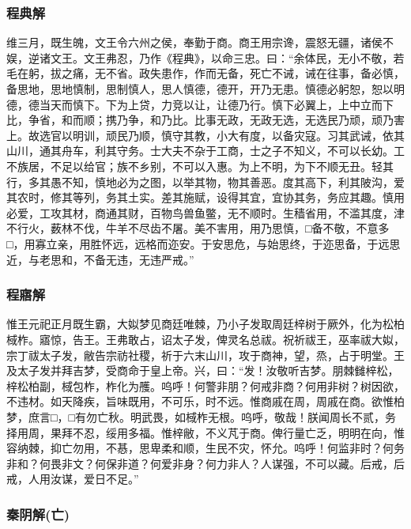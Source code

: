 \documentclass[]{article}
\begin{document}
\hypertarget{header-n94}{%
\subsubsection{程典解}\label{header-n94}}

维三月，既生魄，文王令六州之侯，奉勤于商。商王用宗谗，震怒无疆，诸侯不娱，逆诸文王。文王弗忍，乃作《程典》，以命三忠。曰：``余体民，无小不敬，若毛在躬，拔之痛，无不省。政失患作，作而无备，死亡不诫，诫在往事，备必慎，备思地，思地慎制，思制慎人，思人慎德，德开，开乃无患。慎德必躬恕，恕以明德，德当天而慎下。下为上贷，力竞以让，让德乃行。慎下必翼上，上中立而下比，争省，和而顺；携乃争，和乃比。比事无政，无政无选，无选民乃顽，顽乃害上。故选官以明训，顽民乃顺，慎守其教，小大有度，以备灾寇。习其武诫，依其山川，通其舟车，利其守务。士大夫不杂于工商，士之子不知义，不可以长幼。工不族居，不足以给官；族不乡别，不可以入惠。为上不明，为下不顺无丑。轻其行，多其愚不知，慎地必为之图，以举其物，物其善恶。度其高下，利其陂沟，爱其农时，修其等列，务其土实。差其施赋，设得其宜，宜协其务，务应其趣。慎用必爱，工攻其材，商通其财，百物鸟兽鱼鳖，无不顺时。生穑省用，不滥其度，津不行火，薮林不伐，牛羊不尽齿不屠。美不害用，用乃思慎，□备不敬，不意多□，用寡立亲，用胜怀远，远格而迩安。于安思危，与始思终，于迩思备，于远思近，与老思和，不备无违，无违严戒。''

\hypertarget{header-n98}{%
\subsubsection{程寤解}\label{header-n98}}

惟王元祀正月既生霸，大姒梦见商廷唯棘，乃小子发取周廷梓树于厥外，化为松柏棫柞。寤惊，告王。王弗敢占，诏太子发，俾灵名总祓。祝祈祓王，巫率祓大姒，宗丁祓太子发，敝告宗祊社稷，祈于六末山川，攻于商神，望，烝，占于明堂。王及太子发并拜吉梦，受商命于皇上帝。兴，曰：``发！汝敬听吉梦。朋棘雠梓松，梓松柏副，棫包柞，柞化为雘。呜呼！何警非朋？何戒非商？何用非树？树因欲，不违材。如天降疾，旨味既用，不可乐，时不远。惟商戚在周，周戚在商。欲惟柏梦，庶言□，□有勿亡秋。明武畏，如棫柞无根。呜呼，敬哉！朕闻周长不贰，务择用周，果拜不忍，绥用多福。惟梓敝，不义芃于商。俾行量亡乏，明明在向，惟容纳棘，抑亡勿用，不惎，思卑柔和顺，生民不灾，怀允。呜呼！何监非时？何务非和？何畏非文？何保非道？何爱非身？何力非人？人谋强，不可以藏。后戒，后戒，人用汝谋，爱日不足。''

\hypertarget{header-n102}{%
\subsubsection{秦阴解(亡)}\label{header-n102}}
\end{document}
